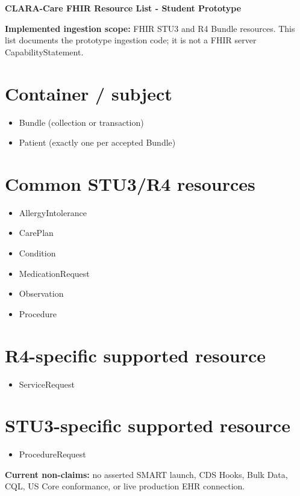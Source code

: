 \documentclass[11pt,letterpaper]{article}
\begin{document}
\begin{center}
{\Large\bfseries CLARA-Care FHIR Resource List - Student Prototype}
\end{center}

\textbf{Implemented ingestion scope:} FHIR STU3 and R4 Bundle resources. This list documents the prototype ingestion code; it is not a FHIR server CapabilityStatement.

\section*{Container / subject}
\begin{itemize}[nosep]
\item Bundle (collection or transaction)
\item Patient (exactly one per accepted Bundle)
\end{itemize}

\section*{Common STU3/R4 resources}
\begin{itemize}[nosep]
\item AllergyIntolerance
\item CarePlan
\item Condition
\item MedicationRequest
\item Observation
\item Procedure
\end{itemize}

\section*{R4-specific supported resource}
\begin{itemize}[nosep]\item ServiceRequest\end{itemize}

\section*{STU3-specific supported resource}
\begin{itemize}[nosep]\item ProcedureRequest\end{itemize}

\textbf{Current non-claims:} no asserted SMART launch, CDS Hooks, Bulk Data, CQL, US Core conformance, or live production EHR connection.
\end{document}
